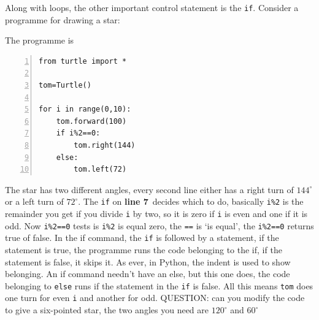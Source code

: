 \documentclass[11pt,a4paper]{scrartcl}
\newcommand{\lnn}[1]{\textbf{line #1}\,}
\begin{document}
Along with loops, the other important control statement is the
\texttt{if}. Consider a programme for drawing a star:
\begin{center}
\end{center}
The programme is
\begin{lstlisting}[numbers=left]
from turtle import *

tom=Turtle()

for i in range(0,10):
    tom.forward(100)
    if i%2==0:
        tom.right(144)
    else:
        tom.left(72)
\end{lstlisting}
The star has two different angles, every second line either has a
right turn of $144^\circ$ or a left turn of $72^\circ$. The
\texttt{if} on \lnn{7} decides which to do, basically \texttt{i\%2} is
the remainder you get if you divide \texttt{i} by two, so it is zero
if \texttt{i} is even and one if it is odd. Now \texttt{i\%2==0} tests
is \texttt{i\%2} is equal zero, the \texttt{==} is \lq{}is equal\rq{},
the \texttt{i\%2==0} returns true of false. In the if command, the
\texttt{if} is followed by a statement, if the statement is true, the
programme runs the code belonging to the if, if the statement is
false, it skips it. As ever, in Python, the indent is used to show
belonging. An if command needn't have an else, but this one does, the
code belonging to \texttt{else} runs if the statement in the
\texttt{if} is false. All this means \texttt{tom} does one turn for
even \texttt{i} and another for odd. QUESTION: can you modify the code
to give a six-pointed star, the two angles you need are $120^\circ$
and $60^\circ$
\end{document}

